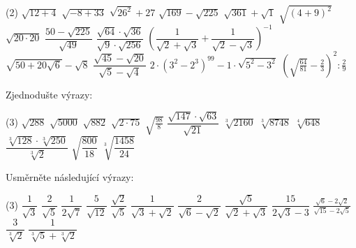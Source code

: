 \documentclass[12pt,a4paper]{article}
\begin{document}
\begin{exercise}
    \begin{tasks}(2)
        \task $\sqrt{12+4}$
        \task $\sqrt{-8+33}$
        \task $\sqrt{26^{2}}+27$      %
        \task $\sqrt{169}-\sqrt{225}$
        \task $\sqrt{361}+\sqrt{1}$
        \task $\sqrt{(4+9)^{2}}$
        \task $\sqrt{20\cdot 20}$
        \task $\dfrac{50-\sqrt{225}}{\sqrt{49}}$
        \task $\dfrac{\sqrt{64}\cdot\sqrt{36}}{\sqrt{9}\cdot\sqrt{256}}$
        \task $\left(\dfrac{1}{\sqrt{2}+\sqrt{3}}+\dfrac{1}{\sqrt{2}-\sqrt{3}}\right)^{-1}$
        \task $\sqrt{50+20\sqrt{6}}-\sqrt{8}$
        \task $\dfrac{\sqrt{45}-\sqrt{20}}{\sqrt{5}-\sqrt{4}}$
        \task $2\cdot(3^2 - 2^3)^{99} - 1\cdot \sqrt{5^2 - 3^2}$
        \task $\left(\sqrt{\frac{64}{81}} - \frac{2}{3}\right)^2 : \frac{2}{9}$
    \end{tasks}
\end{exercise}


\setcounter{section}{7}
\begin{exercise}
    Zjednodušte výrazy:
    \begin{tasks}(3)
        \task $\sqrt{288}$
        \task $\sqrt{5000}$
        \task $\sqrt{882}$
        \task $\sqrt{2\cdot 75}$
        \task $\sqrt{\tfrac{98}{8}}$
        \task $\dfrac{\sqrt{147}\cdot\sqrt{63}}{\sqrt{21}}$
        \task $\sqrt[3]{2160}$
        \task $\sqrt[3]{8748}$
        \task $\sqrt[4]{648}$
        \task $\dfrac{\sqrt[3]{128}\cdot \sqrt[3]{250}}{\sqrt[3]{2}}$
        \task $\sqrt{\dfrac{800}{18}}$
        \task $\sqrt[3]{\dfrac{1458}{24}}$
    \end{tasks}
\end{exercise}


\newpage
\setcounter{section}{8}
\begin{exercise}
    Usměrněte následující výrazy:
    \begin{tasks}(3)
        \task $\dfrac{1}{\sqrt{3}}$
        \task $\dfrac{2}{\sqrt{5}}$
        \task $\dfrac{1}{2\sqrt{7}}$
        \task $\dfrac{5}{\sqrt{12}}$
        \task $\dfrac{\sqrt{2}}{\sqrt{5}}$
        \task $\dfrac{1}{\sqrt{3}+\sqrt{2}}$
        \task $\dfrac{2}{\sqrt{6}-\sqrt{2}}$
        \task $\dfrac{\sqrt{5}}{\sqrt{2}+\sqrt{3}}$
        \task $\dfrac{15}{2\sqrt{3}-3}$
        \task $\frac{\sqrt{6}-2\sqrt{2}}{\sqrt{15}-2\sqrt{5}}$
        \task $\dfrac{3}{\sqrt[3]{2}}$
        \task $\dfrac{1}{\sqrt[3]{5}+\sqrt[3]{2}}$
    \end{tasks}
\end{exercise}
\end{document}
